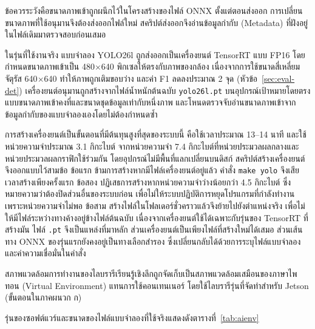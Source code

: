 \documentclass[a4paper,12pt]{report}
\begin{document}
ข้อควรระวังคือขนาดภาพเข้าถูกผนึกไว้ในโครงสร้างของไฟล์ ONNX ตั้งแต่ตอนส่งออก
การเปลี่ยนขนาดภาพที่ใช้อนุมานจึงต้องส่งออกไฟล์ใหม่
สคริปต์ส่งออกจึงอ่านข้อมูลกำกับ (Metadata) ที่ฝังอยู่ในไฟล์เดิมมาตรวจสอบก่อนเสมอ

ในรุ่นที่ใช้งานจริง แบบจำลอง YOLO26l ถูกส่งออกเป็นเครื่องยนต์ TensorRT แบบ FP16
โดยกำหนดขนาดภาพเข้าเป็น 480$\times$640 พิกเซลให้ตรงกับภาพของกล้อง
เนื่องจากการใช้ขนาดสี่เหลี่ยมจัตุรัส 640$\times$640 ทำให้ภาพถูกเติมขอบว่าง
และค่า F1 ลดลงประมาณ 2 จุด (หัวข้อ~\ref{sec:eval-det})
เครื่องยนต์อนุมานถูกสร้างจากไฟล์น้ำหนักต้นฉบับ \texttt{yolo26l.pt} บนอุปกรณ์เป้าหมายโดยตรง
แบบขนาดภาพเข้าคงที่และขนาดชุดข้อมูลเท่ากับหนึ่งภาพ
และโหนดตรวจจับอ่านขนาดภาพเข้าจากข้อมูลกำกับของแบบจำลองเองโดยไม่ต้องกำหนดซ้ำ

การสร้างเครื่องยนต์เป็นขั้นตอนที่มีต้นทุนสูงที่สุดของระบบนี้
คือใช้เวลาประมาณ 13--14 นาที และใช้หน่วยความจำประมาณ 3.1 กิกะไบต์
จากหน่วยความจำ 7.4 กิกะไบต์ที่หน่วยประมวลผลกลางและหน่วยประมวลผลกราฟิกใช้ร่วมกัน
โดยอุปกรณ์ไม่มีพื้นที่แลกเปลี่ยนบนดิสก์ สคริปต์สร้างเครื่องยนต์จึงออกแบบไว้สามข้อ
ข้อแรก ข้ามการสร้างหากมีไฟล์เครื่องยนต์อยู่แล้ว คำสั่ง \texttt{make yolo} จึงเสียเวลาสร้างเพียงครั้งแรก
ข้อสอง ปฏิเสธการสร้างหากหน่วยความจำว่างน้อยกว่า 4.5 กิกะไบต์
ซึ่งหมายความว่าต้องปิดส่วนอื่นของระบบก่อน เพื่อไม่ให้ระบบปฏิบัติการหยุดโปรแกรมที่กำลังทำงานเพราะหน่วยความจำไม่พอ
ข้อสาม สร้างไฟล์ในโฟลเดอร์ชั่วคราวแล้วจึงย้ายไปยังตำแหน่งจริง
เพื่อไม่ให้มีไฟล์ระหว่างทางค้างอยู่ข้างไฟล์ต้นฉบับ
เนื่องจากเครื่องยนต์ใช้ได้เฉพาะกับรุ่นของ TensorRT ที่สร้างมัน
ไฟล์ \texttt{.pt} จึงเป็นแหล่งที่มาหลัก ส่วนเครื่องยนต์เป็นเพียงไฟล์ที่สร้างใหม่ได้เสมอ
ส่วนเส้นทาง ONNX ของรุ่นแรกยังคงอยู่เป็นทางเลือกสำรอง ซึ่งเปลี่ยนกลับได้ด้วยการระบุไฟล์แบบจำลองและค่าความเชื่อมั่นในคำสั่ง

สภาพแวดล้อมการทำงานของไลบรารีเรียนรู้เชิงลึกถูกจัดเก็บเป็นสภาพแวดล้อมเสมือนของภาษาไพทอน
(Virtual Environment) แทนการใช้คอนเทนเนอร์ โดยใช้ไลบรารีรุ่นที่จัดทำสำหรับ Jetson (ขั้นตอนในภาคผนวก ก)

รุ่นของซอฟต์แวร์และขนาดของไฟล์แบบจำลองที่ใช้จริงแสดงดังตารางที่~\ref{tab:aienv}
\end{document}
